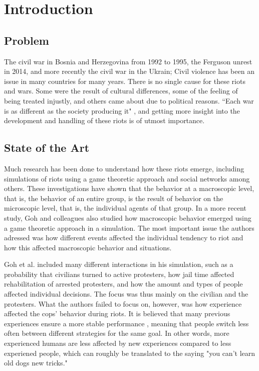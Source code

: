 \section{Introduction}
\subsection{Problem}
The civil war in Bosnia and Herzegovina from 1992 to 1995, the Ferguson unrest in 2014, and more recently the civil war in the Ukrain; Civil violence has been an issue in many countries for many years. There is no single cause for these riots and wars. Some were the result of cultural differences, some of the feeling of being treated injustly, and others came about due to political reasons. ``Each war is as different as the society producing it" \citep*{sambanis2001ethnic}, and getting more insight into the development and handling of these riots is of utmost importance. 

\subsection{State of the Art}
Much research has been done to understand how these riots emerge, including simulations of riots using a game theoretic approach \citep*{myerson1991game} and social networks \citep*{gulden2002spatial} among others. These investigations have shown that the behavior at a macroscopic level, that is, the behavior of an entire group, is the result of behavior on the microscopic level, that is, the individual agents of that group. In a more recent study, Goh and colleagues \citep*{goh2006modeling} also studied how macroscopic behavior emerged using a game theoretic approach in a simulation. The most important issue the authors adressed was how different events affected the individual tendency to riot and how this affected macroscopic behavior and situations. 

Goh et al. included many different interactions in his simulation, such as a probability that civilians turned to active protesters, how jail time affected rehabilitation of arrested protesters, and how the amount and types of people affected individual decisions. The focus was thus mainly on the civilian and the protesters. What the authors failed to focus on, however, was how experience affected the cops' behavior during riots. It is believed that many previous experiences ensure a more stable performance \citep{anderson2007mind,nason2005soar}, meaning that people switch less often between different strategies for the same goal. In other words, more experienced humans are less affected by new experiences compared to less experiened people, which can roughly be translated to the saying "you can't learn old dogs new tricks." 

